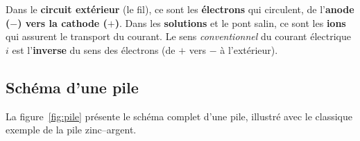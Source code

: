 \documentclass[11pt,a4paper]{article}
\begin{document}
\begin{remarque}
Dans le \textbf{circuit extérieur} (le fil), ce sont les \textbf{électrons} qui circulent, de
l'\textbf{anode ($-$) vers la cathode ($+$)}. Dans les \textbf{solutions} et le pont salin, ce sont
les \textbf{ions} qui assurent le transport du courant. Le sens \emph{conventionnel} du courant
électrique $i$ est l'\textbf{inverse} du sens des électrons (de $+$ vers $-$ à l'extérieur).
\end{remarque}

\subsection{Schéma d'une pile}

La figure~\ref{fig:pile} présente le schéma complet d'une pile, illustré avec le classique
exemple de la pile zinc--argent.
\end{document}
